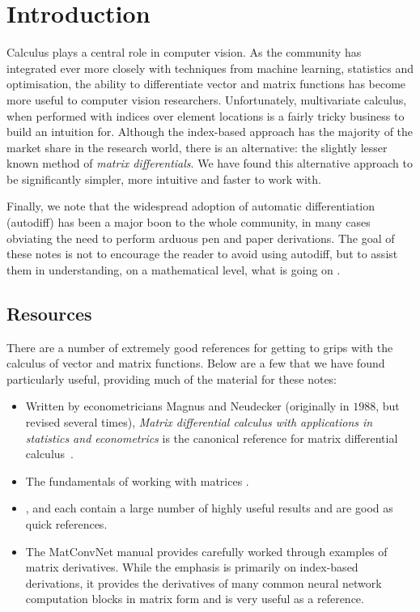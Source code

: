 \chapter{Introduction}\label{sec:intro}

Calculus plays a central role in computer vision. As the community has integrated ever more closely with techniques from machine learning, statistics and optimisation, the ability to differentiate vector and matrix functions has become more useful to computer vision researchers.  Unfortunately, multivariate calculus, when performed with indices over element locations is a fairly tricky business to build an intuition for.  Although the index-based approach has the majority of the market share in the research world, there is an alternative: the slightly lesser known method of \textit{matrix differentials}.  We have found this alternative approach to be significantly simpler, more intuitive and faster to work with.  

Finally, we note that the widespread adoption of automatic differentiation (autodiff) has been a major boon to the whole community, in many cases obviating the need to perform arduous pen and paper derivations.  The goal of these notes is not to encourage the reader to avoid using autodiff, but to assist them in understanding, on a mathematical level, what is going on .

%

\section{Resources}

There are a number of extremely good references for getting to grips with the calculus of vector and matrix functions.  Below are a few that we have found particularly useful, providing much of the material for these notes:

\begin{itemize}
\item Written by econometricians Magnus and Neudecker (originally in $1988$, but revised several times), \textit{Matrix differential calculus with applications in statistics and econometrics} is the canonical reference for matrix differential calculus~\citep{magnus1988matrix}.
\item The fundamentals of working with matrices \citep{searle2017matrix}.
\item \citep{kinghorn1996integrals}, \citep{minka2000old} and \citep{petersen2008matrix} each contain a large number of highly useful results and are good as quick references.
\item The MatConvNet manual \citep{vedaldi2015matconvnetmanual} provides carefully worked through examples of matrix derivatives.  While the emphasis is primarily on index-based derivations, it provides the derivatives of many common neural network computation blocks in matrix form and is very useful as a reference. 
\end{itemize}